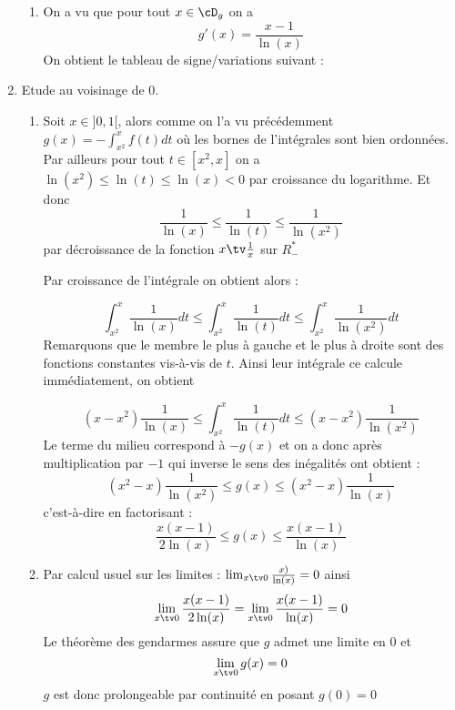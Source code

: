 \begin{correction}
\begin{enumerate}
\begin{enumerate}
\item On  a vu que pour tout $x\in \cD_g$ on a 
$$g'(x) = \frac{x-1}{\ln(x)}$$
On obtient le tableau de signe/variations suivant :






\end{enumerate}
\item Etude au voisinage de $0$. 
\begin{enumerate}
\item Soit $x\in ]0,1[$, alors comme on l'a vu précédemment 
$g(x)  = -\int_{x^2}^x f(t)dt$ où les bornes de l'intégrales sont bien ordonnées. 
Par ailleurs pour tout $t\in [x^2,x]$ on a $\ln(x^2)\leq \ln(t) \leq \ln(x)<0$ par croissance du logarithme. Et donc 
$$\frac{1}{\ln(x)}\leq \frac{1}{\ln(t)}\leq \frac{1}{\ln(x^2)}$$ par décroissance de la fonction $x\tv \frac{1}{x}$ sur $R^*_-$

Par croissance de l'intégrale on obtient alors : 

$$\int_{x^2}^x \frac{1}{\ln(x)}dt \leq \int_{x^2}^x \frac{1}{\ln(t)}dt\leq \int_{x^2}^x \frac{1}{\ln(x^2)}dt$$
Remarquons que le membre le plus à gauche et le plus à droite sont des fonctions constantes vis-à-vis de $t$. Ainsi leur intégrale ce calcule immédiatement, on obtient  

$$(x-x^2) \frac{1}{\ln(x)} \leq  \int_{x^2}^x \frac{1}{\ln(t)}dt\leq (x-x^2)\frac{1}{\ln(x^2)}$$
Le terme du milieu correspond à $-g(x)$ et on a donc  après multiplication par $-1$
qui inverse le sens des inégalités ont obtient : 
$$ (x^2-x) \frac{1}{\ln(x^2)}\leq g(x)\leq (x^2-x) \frac{1}{\ln(x)}$$
c'est-à-dire en factorisant : 
$$ \frac{x(x-1)}{2\ln(x)}\leq g(x)\leq \frac{x(x-1)}{\ln(x)}$$


\item Par calcul usuel sur les limites : $\lim_{x\tv 0} \frac{x)}{\ln(x)} =0$ ainsi 
$$\lim_{x\tv 0}  \frac{x(x-1)}{2\ln(x)} =\lim_{x\tv 0}  \frac{x(x-1)}{\ln(x)} =0$$
Le théorème des gendarmes assure que $g$ admet une limite en $0$ et 
$$\lim_{x\tv 0} g(x) =0$$
$g$ est donc prolongeable par continuité en posant $g(0)=0$


\end{enumerate}
\end{enumerate}
\end{correction}
